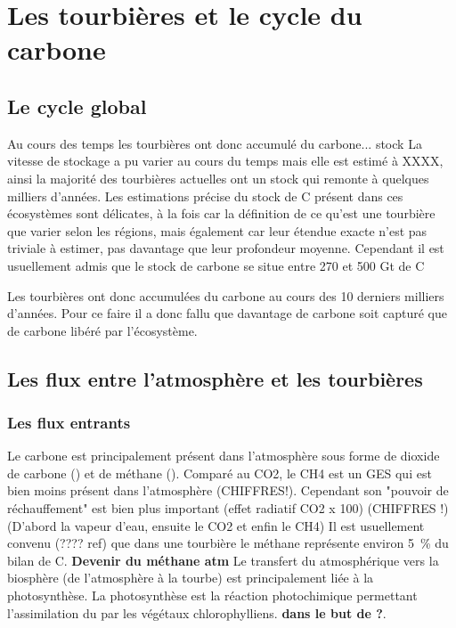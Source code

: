 \section{Les tourbières et le cycle du carbone}

\subsection{Le cycle global}

Au cours des temps les tourbières ont donc accumulé du carbone... stock
La vitesse de stockage a pu varier au cours du temps mais elle est estimé à XXXX, ainsi la majorité des tourbières actuelles ont un stock qui remonte à quelques milliers d'années.
Les estimations précise du stock de C présent dans ces écosystèmes sont délicates, à la fois car la définition de ce qu'est une tourbière que varier selon les régions, mais également car leur étendue exacte n'est pas triviale à estimer, pas davantage que leur profondeur moyenne.
Cependant il est usuellement admis que le stock de carbone se situe entre 270 et 500 Gt de C


Les tourbières ont donc accumulées du carbone au cours des 10 derniers milliers d'années.
Pour ce faire il a donc fallu que davantage de carbone soit capturé que de carbone libéré par l'écosystème.


\subsection{Les flux entre l'atmosphère et les tourbières}

\subsubsection{Les flux entrants}

Le carbone est principalement présent dans l'atmosphère sous forme de dioxide de carbone (\COO) et de méthane (\CHH).
Comparé au CO2, le CH4 est un GES qui est bien moins présent dans l'atmosphère (CHIFFRES!).
Cependant son "pouvoir de réchauffement" est bien plus important (effet radiatif CO2 x 100) (CHIFFRES !) (D'abord la vapeur d'eau, ensuite le CO2 et enfin le CH4)
Il est usuellement convenu (???? ref) que dans une tourbière le méthane représente environ \SI{5}{\percent} du bilan de C.
\textbf{Devenir du méthane atm}
Le transfert du \COO atmosphérique vers la biosphère (de l'atmosphère à la tourbe) est principalement \plop liée à la photosynthèse.
La photosynthèse est la réaction photochimique permettant l'assimilation du \COO par les végétaux chlorophylliens.
\textbf{dans le but de ?}.


